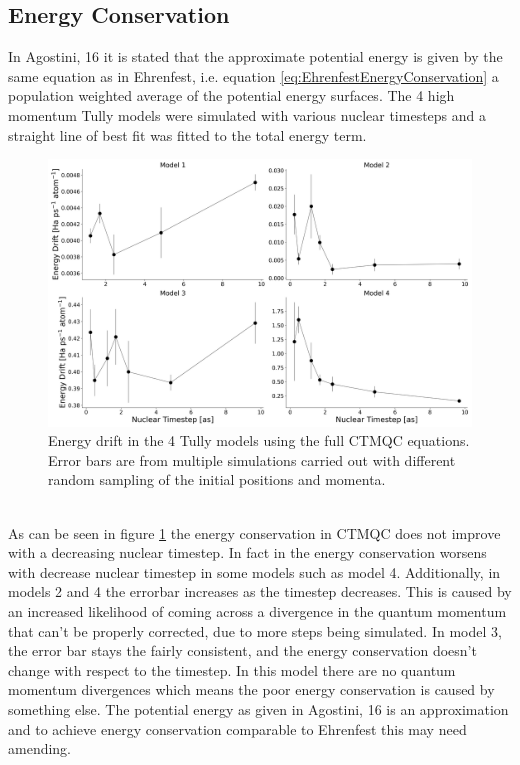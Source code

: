 \subsection{Energy Conservation}
In Agostini, 16 \cite{agostini_quantum-classical_2016} it is stated that the approximate potential energy is given by the same equation as in Ehrenfest, i.e. equation \eqref{eq:EhrenfestEnergyConservation} a population weighted average of the potential energy surfaces. The 4 high momentum Tully models were simulated with various nuclear timesteps and a straight line of best fit was fitted to the total energy term.
\begin{figure}[ht]
  \includegraphics[width=\textwidth]{./img/CTMQC/TullyModels/CTMQC_EnerCons.png}
  \caption{\label{fig:CTMQC_EnergyCons}Energy drift in the 4 Tully models using the full CTMQC equations. Error bars are from multiple simulations carried out with different random sampling of the initial positions and momenta.}
\end{figure}
\\
As can be seen in figure \ref{fig:CTMQC_EnergyCons} the energy conservation in CTMQC does not improve with a decreasing nuclear timestep. In fact in the energy conservation worsens with decrease nuclear timestep in some models such as model 4. Additionally, in models 2 and 4 the errorbar increases as the timestep decreases. This is caused by an increased likelihood of coming across a divergence in the quantum momentum that can't be properly corrected, due to more steps being simulated. In model 3, the error bar stays the fairly consistent, and the energy conservation doesn't change with respect to the timestep. In this model there are no quantum momentum divergences which means the poor energy conservation is caused by something else. The potential energy as given in Agostini, 16 \cite{agostini_quantum-classical_2016} is an approximation and to achieve energy conservation comparable to Ehrenfest this may need amending.


